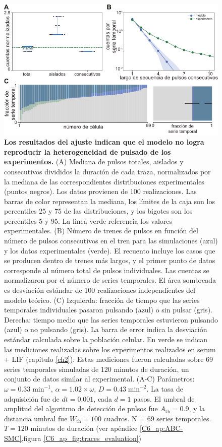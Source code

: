 \documentclass[./main.tex]{subfiles}
\begin{document}
\begin{figure}
    \centering
    \includegraphics[width=1\columnwidth]{figures/chapter6/C6_param_evaluation.pdf} 
    \caption{\textbf{Los resultados del ajuste indican que el modelo no logra reproducir la heterogeneidad de pulsado de los experimentos.} (A) Mediana de pulsos totales, aislados y consecutivos divididos la duración de cada traza, normalizados por la mediana de las correspondientes distribuciones experimentales (puntos negros). Los datos provienen de 100 realizaciones. Las barras de color representan la mediana, los límites de la caja son los percentiles 25 y 75 de las distribuciones, y los bigotes son los percentiles 5 y 95. La linea verde referencia los valores experimentales. (B) Número de trenes de pulsos en función del número de pulsos consecutivos en el tren para las simulaciones (azul) y los datos experimentales (verde). El recuento incluye los casos que se producen dentro de trenes más largos, y el primer punto de datos corresponde al número total de pulsos individuales. Las cuentas se normalizaron por el número de series temporales. El área sombreada es desviación estándar de 100 realizaciones independientes del modelo teórico. (C) Izquierda: fracción de tiempo que las series temporales individuales pasaron pulsando (azul) o sin pulsar (gris). Derecha: tiempo medio que las series temporales estuvieron pulsando (azul) o no pulsando (gris). La barra de error indica la desviación estándar calculada sobre la población celular. En verde se indican las mediciones realizadas sobre los experimentos realizados en serum + LIF (capítulo \ref{ch2}). Estas mediciones fueron calculadas sobre 69 series temporales simuladas de 120 minutos de duración, un conjunto de datos similar al experimental. (A-C) Parámetros:  $\omega = 0.33 \;\text{min}^{-1}$, $\alpha = 1.02 \times \omega$, $ D = 0.43 \; \text{min}^{-2}$. La tasa de adquisición fue de $dt = 0.001$, cada $d = 1$ pasos. El umbral de amplitud del algoritmo de detección de pulsos fue $A_{\text{th}} = 0.9$, y la distancia umbral fue $W_{\text{th}} = 100\text{ cuadros}$. N = $69$ series temporales. $T = 120$ minutos de duración (ver apéndice \ref{C6_ap:ABC-SMC},figura \ref{C6_ap_fig:traces_evaluation})}
    \label{C6_fig:param_evaluation}
\end{figure} 
\end{document}
